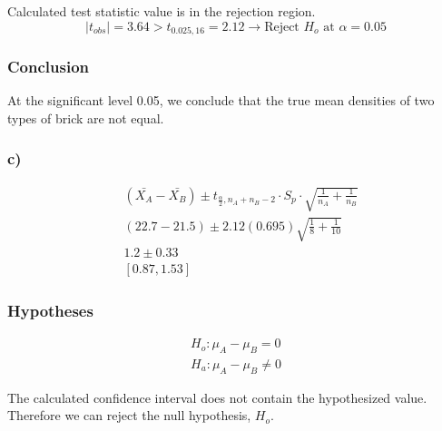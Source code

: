 \documentclass{article}
\begin{document}
       Calculated test statistic value is in the rejection region.
       \begin{equation*}
        |t_{obs}| = 3.64 > t_{0.025, 16} = 2.12 \rightarrow \text{Reject } H_{o} \text{ at } \alpha = 0.05
       \end{equation*}

       \subsubsection*{Conclusion}
       At the significant level 0.05, we conclude that 
       the true mean densities of two types of brick are not equal.

       \subsubsection*{c)}
            \begin{align*}
                &(\bar{X_{A}}- \bar{X_{B}}) \pm t_{\frac{\alpha}{2}, n_{A} + n_{B} - 2} \cdot S_{p} \cdot \sqrt{\frac{1}{n_{A}}+\frac{1}{n_{B}}}\\
                &(22.7 - 21.5) \pm 2.12 (0.695) \sqrt{\frac{1}{8}+\frac{1}{10}}\\
                &1.2 \pm 0.33\\
                &[0.87, 1.53]
            \end{align*}

        \subsubsection*{Hypotheses}
            \begin{align*}
                H_{o}: \mu_{A} - \mu_{B} = 0\\
                H_{a}: \mu_{A} - \mu_{B} \neq 0
            \end{align*}

            The calculated confidence interval does not contain the hypothesized value.
            Therefore we can reject the null hypothesis, $H_{o}$.





       

        

          
\end{document}
